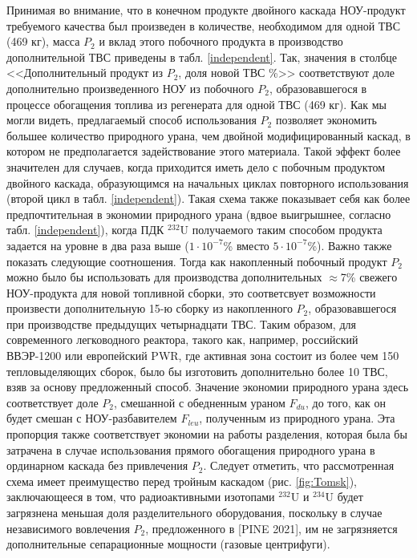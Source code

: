 Принимая во внимание, что в конечном продукте двойного каскада НОУ-продукт требуемого качества был произведен в количестве, необходимом для одной ТВС (469 кг), масса $P_2$ и вклад этого побочного продукта в производство дополнительной ТВС приведены в табл. \ref{independent}. Так, значения в столбце <<Дополнительный продукт из $P_2$, доля новой ТВС \%>> соответствуют доле дополнительно произведенного НОУ из побочного $P_2$, образовавшегося в процессе обогащения топлива из регенерата для одной ТВС (469 кг).
Как мы могли видеть, предлагаемый способ использования $P_2$ позволяет экономить большее количество природного урана, чем двойной модифицированный каскад, в котором не предполагается задействование этого материала. Такой эффект более значителен для случаев, когда приходится иметь дело с побочным продуктом двойного каскада, образующимся на начальных циклах повторного использования (второй цикл в табл. \ref{independent}). Такая схема также показывает себя как более предпочтительная в экономии природного урана (вдвое выигрышнее, согласно табл. \ref{independent}), когда ПДК $^{232}$U получаемого таким способом продукта задается на уровне в два раза выше ($1\cdot10^{-7}$\% вместо $5\cdot10^{-7}$\%). Важно также показать следующие соотношения. Тогда как накопленный побочный продукт $P_2$ можно было бы использовать для производства дополнительных $\approx$7\% свежего НОУ-продукта для новой топливной сборки, это соответсвует возможности произвести дополнительную 15-ю сборку из накопленного $P_2$, образовавшегося при производстве предыдущих четырнадцати ТВС. Таким образом, для современного легководного реактора, такого как, например, российский ВВЭР-1200 или европейский PWR, где активная зона состоит из более чем 150 тепловыделяющих сборок, было бы изготовить дополнительно более 10 ТВС, взяв за основу предложенный способ. Значение экономии природного урана здесь соответствует доле $P_2$, смешанной с обедненным ураном $F_{du}$, до того, как он будет смешан с НОУ-разбавителем $F_{leu}$, полученным из природного урана. Эта пропорция также соответствует экономии на работы разделения, которая была бы затрачена в случае использования прямого обогащения природного урана в ординарном каскада без привлечения $P_2$.
Следует отметить, что рассмотренная схема имеет преимущество перед тройным каскадом (рис. \ref{fig:Tomsk}), заключающееся в том, что радиоактивными изотопами $^{232}$U и $^{234}$U будет загрязнена меньшая доля разделительного оборудования, поскольку в случае независимого вовлечения $P_2$, предложенного в [PINE 2021], им не загрязняется дополнительные сепарационные мощности (газовые центрифуги).

\clearpage